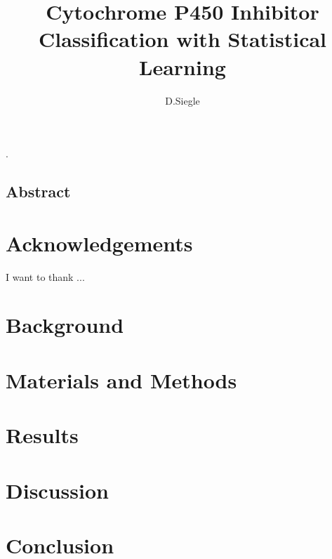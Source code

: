 .\documentclass[12pt]{report}
\author{D.Siegle}
\title{Cytochrome P450 Inhibitor Classification with Statistical Learning}
\date{}
\begin{document}
\maketitle

\begin{doublespacing}
\chapter*{Abstract}

\end{doublespacing}

\tableofcontents
\listoffigures
\listoftables

\begin{doublespacing}
\chapter*{Acknowledgements}
I want to thank ...

\chapter{Background}


\chapter{Materials and Methods}


\chapter{Results}




\chapter{Discussion}


\chapter{Conclusion}


\end{doublespacing}

{}

\end{document}
